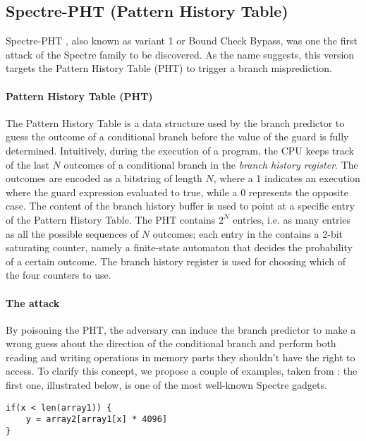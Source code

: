 \documentclass[12pt,a4paper]{book}
\theoremstyle{definition}
\begin{document}
	\subsection{Spectre-PHT (Pattern History Table)}\label{sec:spectre-pht}
	Spectre-PHT \cite{Kocher2019}\cite{Canella2019}\cite{Evtyushkin2018}, also known as variant 1 or Bound Check Bypass, was one the first attack of the Spectre family to be discovered. As the name suggests, this version targets the Pattern History Table (PHT) to trigger a branch misprediction.
	\paragraph{Pattern History Table (PHT)} The Pattern History Table \cite{Fog2021} is a data structure used by the branch predictor to guess the outcome of a conditional branch before the value of the guard is fully determined. Intuitively, during the execution of a program, the CPU keeps track of the last $N$ outcomes of a conditional branch in the \textit{branch history register}. The outcomes are encoded as a bitstring of length $N$, where a 1 indicates an execution where the guard expression evaluated to true, while a 0 represents the opposite case. The content of the branch history buffer is used to point at a specific entry of the Pattern History Table. The PHT contains $2^N$ entries, i.e. as many entries as all the possible sequences of $N$ outcomes; each entry in
	the contains a 2-bit saturating counter, namely a finite-state automaton that decides the probability of a certain outcome. The branch history register is used for choosing which of the four counters to use.
	
	\paragraph{The attack} By poisoning the PHT, the adversary can induce the branch predictor to make a wrong guess about the direction of the conditional branch and perform both reading and writing operations in memory parts they shouldn't have the right to access. To clarify this concept, we propose a couple of examples, taken from \cite{Canella2019}: the first one, illustrated below, is one of the most well-known Spectre gadgets.
	
	\vspace{3mm}
	\begin{minipage}{.5\textwidth}
		\begin{lstlisting}
if(x < len(array1)) {
	y = array2[array1[x] * 4096]
}
		\end{lstlisting}
	\end{minipage}
	
\end{document}
